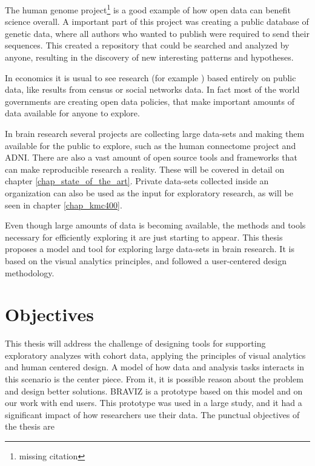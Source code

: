 The human genome project\footnote{missing citation} is a good example of how open data can benefit science overall. A important part of this project was creating a public database of genetic data, where all authors who wanted to publish were required to send their sequences. This created a repository that could be searched and analyzed by anyone, resulting in the discovery of new interesting patterns and hypotheses.

In economics it is usual to see research (for example \autocite{levitt_freakonomics_2006}) based entirely on public data, like results from census or social networks data. In fact most of the world governments are creating open data policies, that make important amounts of data available for anyone to explore.

In brain research several projects are collecting large data-sets and making them available for the public to explore, such as the human connectome project\autocite{rosen_human_2010} and ADNI\autocite{jack_alzheimers_2008}. There are also a vast amount of open source tools and frameworks that can make reproducible research a reality. These will be covered in detail on chapter \ref{chap_state_of_the_art}. Private data-sets collected inside an organization can also be used as the input for exploratory research, as will be seen in chapter \ref{chap_kmc400}.

Even though large amounts of data is becoming available, the methods and tools necessary for efficiently exploring it are just starting to appear. This thesis proposes a model and tool for exploring large data-sets in brain research. It is based on the visual analytics principles, and followed a user-centered design methodology.











\section{Objectives}

This thesis will address the challenge of designing tools for supporting exploratory analyzes with cohort data, applying the principles of visual analytics and human centered design. A model of how data and analysis tasks interacts in this scenario is the center piece. From it, it is possible reason about the problem and design better solutions. BRAVIZ is a prototype based on this model and on our work with end users. This prototype was used in a large study, and it had a significant impact of how researchers use their data. The punctual objectives of the thesis are

